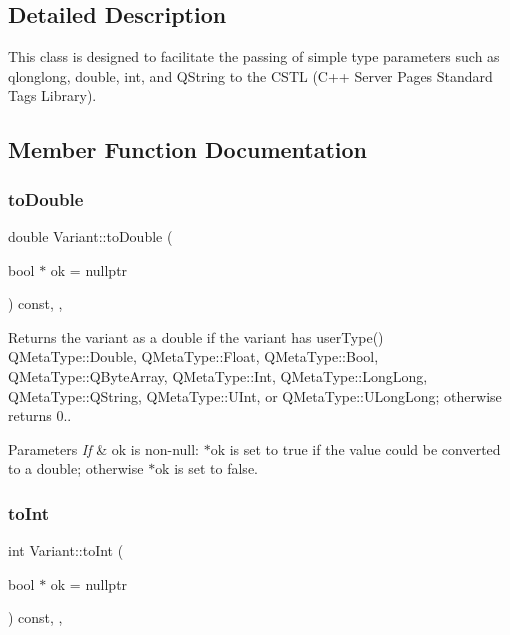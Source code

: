 \subsection{Detailed Description}
This class is designed to facilitate the passing of simple type parameters such as qlonglong, double, int, and Q\+String to the C\+S\+TL (C++ Server Pages Standard Tags Library). 

\subsection{Member Function Documentation}
\mbox{\label{class_variant_a17e4fd1648eb98fdc0a68302c392a216}} 
\subsubsection{\texorpdfstring{to\+Double}{toDouble}}
{\footnotesize\ttfamily double Variant\+::to\+Double (\begin{DoxyParamCaption}\item[{bool $\ast$}]{ok = {\ttfamily nullptr} }\end{DoxyParamCaption}) const\hspace{0.3cm}{\ttfamily [inline]}, {\ttfamily [slot]}, {\ttfamily [noexcept]}}



Returns the variant as a double if the variant has user\+Type() Q\+Meta\+Type\+::\+Double, Q\+Meta\+Type\+::\+Float, Q\+Meta\+Type\+::\+Bool, Q\+Meta\+Type\+::\+Q\+Byte\+Array, Q\+Meta\+Type\+::\+Int, Q\+Meta\+Type\+::\+Long\+Long, Q\+Meta\+Type\+::\+Q\+String, Q\+Meta\+Type\+::\+U\+Int, or Q\+Meta\+Type\+::\+U\+Long\+Long; otherwise returns 0.. 


\begin{DoxyParams}{Parameters}
{\em If} & ok is non-\/null\+: $\ast$ok is set to true if the value could be converted to a double; otherwise $\ast$ok is set to false. \\
\hline
\end{DoxyParams}
\mbox{\label{class_variant_a832bfdf3d791497b776c67b322fec871}} 
\subsubsection{\texorpdfstring{to\+Int}{toInt}}
{\footnotesize\ttfamily int Variant\+::to\+Int (\begin{DoxyParamCaption}\item[{bool $\ast$}]{ok = {\ttfamily nullptr} }\end{DoxyParamCaption}) const\hspace{0.3cm}{\ttfamily [inline]}, {\ttfamily [slot]}, {\ttfamily [noexcept]}}



